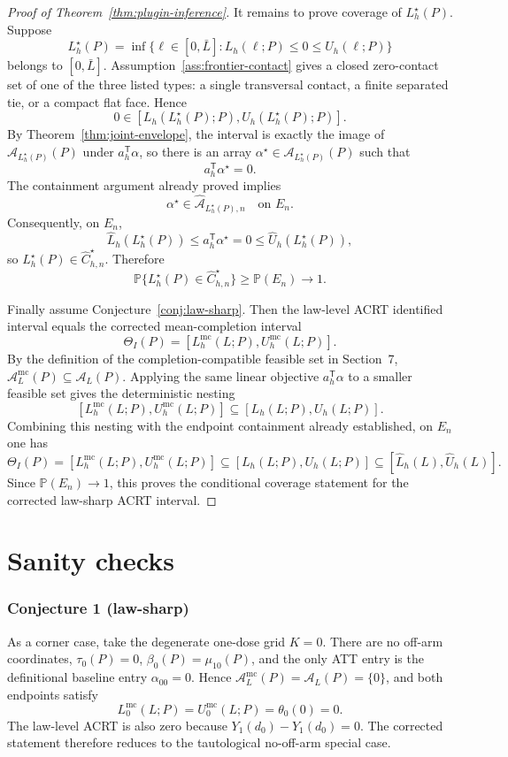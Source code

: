 \documentclass[11pt]{article}
\renewcommand{\Pr}{\mathbb{P}}
\newcommand{\transpose}{\mathsf{T}}
\theoremstyle{definition}
\theoremstyle{plain}
\theoremstyle{remark}
\begin{document}
\begin{proof}[Proof of Theorem~\ref{thm:plugin-inference}]
It remains to prove coverage of \(L_h^\star(P)\).  Suppose
\[
  L_h^\star(P)=\inf\{\ell\in[0,\bar L]:L_h(\ell;P)\le0\le U_h(\ell;P)\}
\]
belongs to \([0,\bar L]\).  Assumption~\ref{ass:frontier-contact} gives a
closed zero-contact set of one of the three listed types: a single
transversal contact, a finite separated tie, or a compact flat face.  Hence
\[
  0\in[L_h(L_h^\star(P);P),U_h(L_h^\star(P);P)] .
\]
By Theorem~\ref{thm:joint-envelope}, the interval is exactly the image of
\(\mathcal A_{L_h^\star(P)}(P)\) under \(a_h^\transpose\alpha\), so there is
an array \(\alpha^\star\in\mathcal A_{L_h^\star(P)}(P)\) such that
\[
  a_h^\transpose\alpha^\star=0 .
\]
The containment argument already proved implies
\[
  \alpha^\star\in\widehat{\mathcal A}_{L_h^\star(P),n}
  \quad\text{on }E_n .
\]
Consequently, on \(E_n\),
\[
  \widehat L_h(L_h^\star(P))
  \le
  a_h^\transpose\alpha^\star
  =
  0
  \le
  \widehat U_h(L_h^\star(P)),
\]
so \(L_h^\star(P)\in\widehat C_{h,n}^\star\).  Therefore
\[
  \Pr\{L_h^\star(P)\in\widehat C_{h,n}^\star\}\ge \Pr(E_n)\to1 .
\]

Finally assume Conjecture~\ref{conj:law-sharp}.  Then the law-level ACRT
identified interval equals the corrected mean-completion interval
\[
  \Theta_I(P)
  =
  [L_h^{\mathrm{mc}}(L;P),U_h^{\mathrm{mc}}(L;P)] .
\]
By the definition of the completion-compatible feasible set in Section~7,
\(\mathcal A_L^{\mathrm{mc}}(P)\subseteq\mathcal A_L(P)\).  Applying the
same linear objective \(a_h^\transpose\alpha\) to a smaller feasible set gives
the deterministic nesting
\[
  [L_h^{\mathrm{mc}}(L;P),U_h^{\mathrm{mc}}(L;P)]
  \subseteq
  [L_h(L;P),U_h(L;P)] .
\]
Combining this nesting with the endpoint containment already established,
on \(E_n\) one has
\[
  \Theta_I(P)
  =
  [L_h^{\mathrm{mc}}(L;P),U_h^{\mathrm{mc}}(L;P)]
  \subseteq
  [L_h(L;P),U_h(L;P)]
  \subseteq
  [\widehat L_h(L),\widehat U_h(L)] .
\]
Since \(\Pr(E_n)\to1\), this proves the conditional coverage statement for
the corrected law-sharp ACRT interval.
\end{proof}

\section{Sanity checks}
\subsubsection*{Conjecture 1 (law-sharp)}
As a corner case, take the degenerate one-dose grid \(K=0\).  There are no
off-arm coordinates, \(\tau_0(P)=0\), \(\beta_0(P)=\mu_{10}(P)\), and the only
ATT entry is the definitional baseline entry \(\alpha_{00}=0\).  Hence
\(\mathcal A_L^{\mathrm{mc}}(P)=\mathcal A_L(P)=\{0\}\), and both endpoints
satisfy
\[
  L_0^{\mathrm{mc}}(L;P)=U_0^{\mathrm{mc}}(L;P)=\theta_0(0)=0.
\]
The law-level ACRT is also zero because \(Y_1(d_0)-Y_1(d_0)=0\).  The corrected
statement therefore reduces to the tautological no-off-arm special case.
\end{document}

